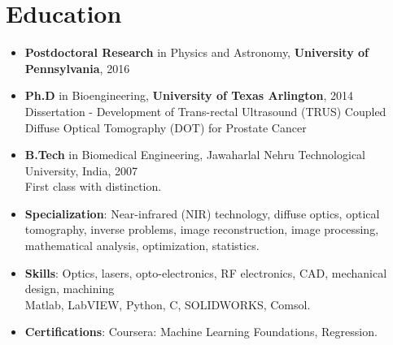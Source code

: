 \documentclass{my_cv}
\begin{document}
\section{Education}
\begin{flushleft}  

\begin{itemize}[leftmargin=*]

\item[] \textbf{Postdoctoral Research} in Physics and Astronomy, \textbf{University of Pennsylvania},  2016\\

\item[] \textbf{Ph.D} in Bioengineering, \textbf{University of Texas Arlington}, 2014 \\ 
\hspace{\labelwidth}Dissertation -  Development of Trans-rectal Ultrasound (TRUS) Coupled Diffuse Optical Tomography\hspace{\labelwidth} (DOT) for Prostate Cancer 	
	
\item[] \textbf{B.Tech} in Biomedical Engineering, {Jawaharlal Nehru Technological University}, India,  2007\\
\hspace{\labelwidth}First class with distinction.

\item[] \textbf{Specialization}: Near-infrared (NIR) technology, diffuse optics, optical tomography, inverse problems,
\hspace{\labelwidth} image reconstruction, image processing, mathematical analysis, optimization, statistics.

\item[] \textbf{Skills}: Optics, lasers, opto-electronics, RF electronics, CAD, mechanical design, machining\\
\hspace{\labelwidth} Matlab, LabVIEW, Python, C, SOLIDWORKS, Comsol.

\item[] \textbf{Certifications}: Coursera: Machine Learning Foundations, Regression.

\end{itemize}

\end{flushleft}  


\vspace{-7mm}  %
\end{document}
